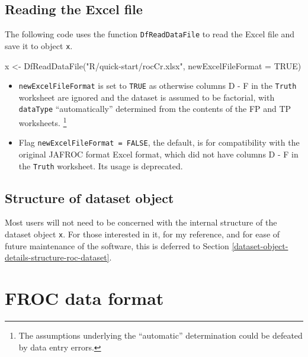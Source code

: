 \documentclass[
]{book}
\newenvironment{Shaded}{\begin{snugshade}}{\end{snugshade}}
\newcommand{\AttributeTok}[1]{\textcolor[rgb]{0.77,0.63,0.00}{#1}}
\newcommand{\ConstantTok}[1]{\textcolor[rgb]{0.00,0.00,0.00}{#1}}
\newcommand{\FunctionTok}[1]{\textcolor[rgb]{0.00,0.00,0.00}{#1}}
\newcommand{\NormalTok}[1]{#1}
\newcommand{\OtherTok}[1]{\textcolor[rgb]{0.56,0.35,0.01}{#1}}
\newcommand{\StringTok}[1]{\textcolor[rgb]{0.31,0.60,0.02}{#1}}
\begin{document}
\hypertarget{quick-start-roc-read}{%
\section{Reading the Excel file}\label{quick-start-roc-read}}

The following code uses the function \texttt{DfReadDataFile} to read the Excel file and save it to object \texttt{x}.

\begin{Shaded}
\begin{Highlighting}[]
\NormalTok{x }\OtherTok{\textless{}{-}} \FunctionTok{DfReadDataFile}\NormalTok{(}\StringTok{"R/quick{-}start/rocCr.xlsx"}\NormalTok{, }\AttributeTok{newExcelFileFormat =} \ConstantTok{TRUE}\NormalTok{)}
\end{Highlighting}
\end{Shaded}

\begin{itemize}
\item
  \texttt{newExcelFileFormat} is set to \texttt{TRUE} as otherwise columns D - F in the \texttt{Truth} worksheet are ignored and the dataset is assumed to be factorial, with \texttt{dataType} ``automatically'' determined from the contents of the FP and TP worksheets. \footnote{The assumptions underlying the ``automatic'' determination could be defeated by data entry errors.}
\item
  Flag \texttt{newExcelFileFormat\ =\ FALSE}, the default, is for compatibility with the original JAFROC format Excel format, which did not have columns D - F in the \texttt{Truth} worksheet. Its usage is deprecated.
\end{itemize}

\hypertarget{quick-start-roc-structure-dataset}{%
\section{Structure of dataset object}\label{quick-start-roc-structure-dataset}}

Most users will not need to be concerned with the internal structure of the dataset object \texttt{x}. For those interested in it, for my reference, and for ease of future maintenance of the software, this is deferred to Section \ref{dataset-object-details-structure-roc-dataset}.

\hypertarget{quick-start-froc-data-format}{%
\chapter{FROC data format}\label{quick-start-froc-data-format}}
\end{document}

